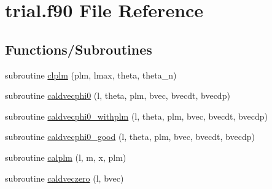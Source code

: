 \hypertarget{trial_8f90}{\section{trial.\-f90 File Reference}
\label{trial_8f90}
}
\subsection*{Functions/\-Subroutines}
\begin{DoxyCompactItemize}
\item 
subroutine \hyperlink{trial_8f90_a3eb0c3327e6ccf85a1f9edf0197ad3d3}{clplm} (plm, lmax, theta, theta\-\_\-n)
\item 
subroutine \hyperlink{trial_8f90_a76be97bff1fd4fa9e48a86d50cac9bec}{caldvecphi0} (l, theta, plm, bvec, bvecdt, bvecdp)
\item 
subroutine \hyperlink{trial_8f90_a3dd87a3b648666abfb632fc58678ede6}{caldvecphi0\-\_\-withplm} (l, theta, plm, bvec, bvecdt, bvecdp)
\item 
subroutine \hyperlink{trial_8f90_aee02cccb6fbe5a08179c4b2c5db2544f}{caldvecphi0\-\_\-good} (l, theta, plm, bvec, bvecdt, bvecdp)
\item 
subroutine \hyperlink{trial_8f90_adcd3d6dff34b72d1aa8a37507aff4ddb}{calplm} (l, m, x, plm)
\item 
subroutine \hyperlink{trial_8f90_af9cd0f33b6677c04b591dd90b88cad15}{caldveczero} (l, bvec)
\end{DoxyCompactItemize}


